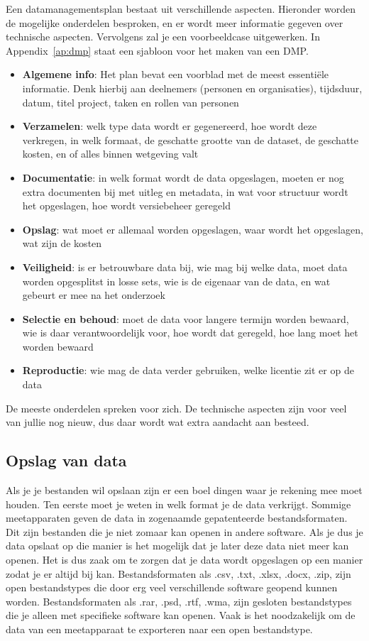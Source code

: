 Een datamanagementsplan bestaat uit verschillende aspecten. Hieronder worden de mogelijke onderdelen besproken, en er wordt meer informatie gegeven over technische aspecten. Vervolgens zal je een voorbeeldcase uitgewerken. In Appendix~\ref{ap:dmp} staat een sjabloon voor het maken van een DMP. 
\begin{itemize}
    \item \textbf{Algemene info}: Het plan bevat een voorblad met de meest essentiële informatie. Denk hierbij aan deelnemers (personen en organisaties), tijdsduur, datum, titel project, taken en rollen van personen
    \item \textbf{Verzamelen}: welk type data wordt er gegenereerd, hoe wordt deze verkregen, in welk formaat, de geschatte grootte van de dataset, de geschatte kosten, en of alles binnen wetgeving valt
    \item \textbf{Documentatie}: in welk format wordt de data opgeslagen, moeten er nog extra documenten bij met uitleg en metadata, in wat voor structuur wordt het opgeslagen, hoe wordt versiebeheer geregeld 
    \item \textbf{Opslag}: wat moet er allemaal worden opgeslagen, waar wordt het opgeslagen, wat zijn de kosten
    \item \textbf{Veiligheid}: is er betrouwbare data bij, wie mag bij welke data, moet data worden opgesplitst in losse sets, wie is de eigenaar van de data, en wat gebeurt er mee na het onderzoek
    \item \textbf{Selectie en behoud}: moet de data voor langere termijn worden bewaard, wie is daar verantwoordelijk voor, hoe wordt dat geregeld, hoe lang moet het worden bewaard
    \item \textbf{Reproductie}: wie mag de data verder gebruiken, welke licentie zit er op de data
\end{itemize}

De meeste onderdelen spreken voor zich. De technische aspecten zijn voor veel van jullie nog nieuw, dus daar wordt wat extra aandacht aan besteed.

\subsection*{Opslag van data}
Als je je bestanden wil opslaan zijn er een boel dingen waar je rekening mee moet houden. Ten eerste moet je weten in welk format je de data verkrijgt. Sommige meetapparaten geven de data in zogenaamde gepatenteerde bestandsformaten. Dit zijn bestanden die je niet zomaar kan openen in andere software. Als je dus je data opslaat op die manier is het mogelijk dat je later deze data niet meer kan openen. Het is dus zaak om te zorgen dat je data wordt opgeslagen op een manier zodat je er altijd bij kan. Bestandsformaten als .csv, .txt, .xlsx, .docx, .zip, zijn open bestandstypes die door erg veel verschillende software geopend kunnen worden. Bestandsformaten als .rar, .psd, .rtf, .wma, zijn gesloten bestandstypes die je alleen met specifieke software kan openen. Vaak is het noodzakelijk om de data van een meetapparaat te exporteren naar een open bestandstype. 

